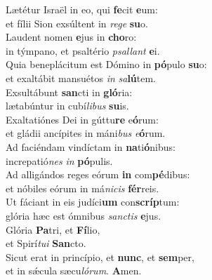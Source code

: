\evenverse Lætétur Israël in eo, qui \textbf{fe}cit \textbf{e}um:~\*\\
\evenverse et fílii Sion exsúltent in \textit{re}\textit{ge} \textbf{su}o.\\
\oddverse Laudent nomen \textbf{e}jus in \textbf{cho}ro:~\*\\
\oddverse in týmpano, et psaltério \textit{psal}\textit{lant} \textbf{e}i.\\
\evenverse Quia beneplácitum est Dómino in \textbf{pó}pulo \textbf{su}o:~\*\\
\evenverse et exaltábit mansuétos \textit{in} \textit{sa}\textbf{lú}tem.\\
\oddverse Exsultábunt \textbf{san}cti in \textbf{gló}ria:~\*\\
\oddverse lætabúntur in cubí\textit{li}\textit{bus} \textbf{su}is.\\
\evenverse Exaltatiónes Dei in gúttu\textbf{re} e\textbf{ó}rum:~\*\\
\evenverse et gládii ancípites in máni\textit{bus} \textit{e}\textbf{ó}rum.\\
\oddverse Ad faciéndam vindíctam in \textbf{na}ti\textbf{ó}nibus:~\*\\
\oddverse increpatió\textit{nes} \textit{in} \textbf{pó}pulis.\\
\evenverse Ad alligándos reges eórum \textbf{in} com\textbf{pé}dibus:~\*\\
\evenverse et nóbiles eórum in má\textit{ni}\textit{cis} \textbf{fér}reis.\\
\oddverse Ut fáciant in eis judíci\textbf{um} con\textbf{scríp}tum:~\*\\
\oddverse glória hæc est ómnibus \textit{san}\textit{ctis} \textbf{e}jus.\\
\evenverse Glória \textbf{Pa}tri, et \textbf{Fí}lio,~\*\\
\evenverse et Spirí\textit{tu}\textit{i} \textbf{San}cto.\\
\oddverse Sicut erat in princípio, et \textbf{nunc}, et \textbf{sem}per,~\*\\
\oddverse et in sǽcula sæcu\textit{ló}\textit{rum}. \textbf{A}men.\\
